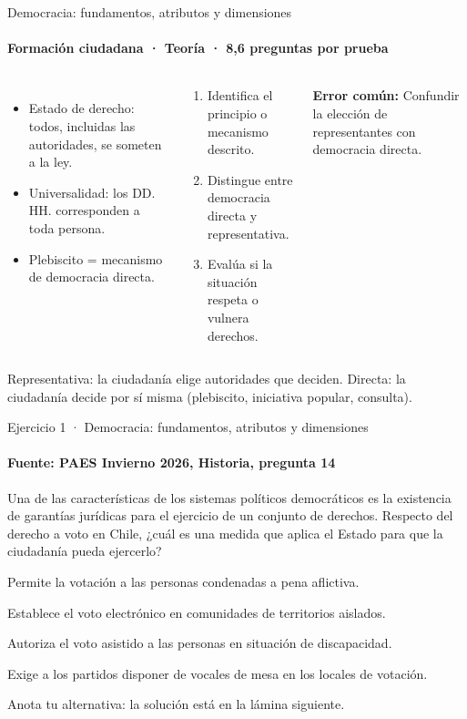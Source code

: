 \documentclass[aspectratio=169,11pt]{beamer}
\newcommand{\alternativa}[2]{\begin{opcion}\tecla{#1}\hspace{0.6em}#2\end{opcion}}
\newlength{\ajustealto}
\newenvironment{ajustar}[1][0.74\textheight]
  {\setlength{\ajustealto}{#1}\begin{lrbox}{\ajustecaja}\begin{minipage}{\textwidth}}
  {\end{minipage}\end{lrbox}%
   \ifdim\dimexpr\ht\ajustecaja+\dp\ajustecaja\relax>\ajustealto
     \resizebox*{!}{\ajustealto}{\usebox{\ajustecaja}}\else\usebox{\ajustecaja}\fi}
\begin{document}
\begin{frame}{Democracia: fundamentos, atributos y dimensiones}
\label{tema-hi-democracia}
\framesubtitle{Formación ciudadana · Teoría · 8,6 preguntas por prueba}
\begin{ajustar}
\begin{columns}[T,onlytextwidth]
\begin{itemize}\footnotesize
\item Estado de derecho: todos, incluidas las autoridades, se someten a la ley.
\item Universalidad: los DD. HH. corresponden a toda persona.
\item Plebiscito = mecanismo de democracia directa.
\end{itemize}
\begin{cajaregla}\scriptsize \begin{enumerate}\item Identifica el principio o mecanismo descrito.\item Distingue entre democracia directa y representativa.\item Evalúa si la situación respeta o vulnera derechos.\end{enumerate}\end{cajaregla}
\begin{notagris}\scriptsize \textbf{Error común:} Confundir la elección de representantes con democracia directa.\end{notagris}
\end{columns}
\begin{cajaclave}\footnotesize
Representativa: la ciudadanía elige autoridades que deciden. Directa: la ciudadanía decide por sí misma (plebiscito, iniciativa popular, consulta).
\end{cajaclave}
\end{ajustar}
\end{frame}

\begin{frame}{Ejercicio 1 · Democracia: fundamentos, atributos y dimensiones}
\framesubtitle{Fuente: PAES Invierno 2026, Historia, pregunta 14}
\begin{ajustar}[0.7\textheight]
{\small Una de las características de los sistemas políticos democráticos es la existencia de garantías jurídicas para el ejercicio de un conjunto de derechos. Respecto del derecho a voto en Chile, ¿cuál es una medida que aplica el Estado para que la ciudadanía pueda ejercerlo?}
\vspace{0.4em}
\alternativa{A}{Permite la votación a las personas condenadas a pena aflictiva.}
\alternativa{B}{Establece el voto electrónico en comunidades de territorios aislados.}
\alternativa{C}{Autoriza el voto asistido a las personas en situación de discapacidad.}
\alternativa{D}{Exige a los partidos disponer de vocales de mesa en los locales de votación.}
\end{ajustar}
\vfill{\tiny\color{zinc500}\hfill Anota tu alternativa: la solución está en la lámina siguiente.}
\end{frame}
\end{document}
